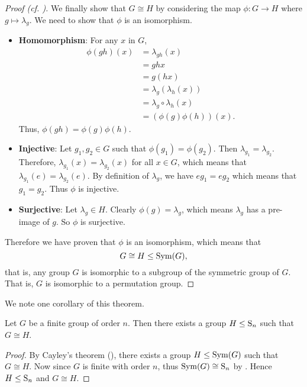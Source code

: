 \begin{proof}[Proof (cf. {\cite[Proof 2]{proofwiki_cayleys-theorem}})]
    We finally show that $G \cong H$ by considering the map $\phi: G\to H$ where $g \mapsto \lambda_g$. We need to show that $\phi$ is an isomorphism.
    \begin{itemize}
        \item \textbf{Homomorphism}: For any $x$ in $G$,
            \begin{align*}
                \phi(gh)(x) &= \lambda_{gh}(x)\\
                &= ghx\\
                &= g(hx)\\
                &= \lambda_g\left(\lambda_h(x)\right)\\
                &= \lambda_g\circ\lambda_h(x)\\
                &= (\phi(g)\phi(h))(x).
            \end{align*}
            Thus, $\phi(gh) = \phi(g)\phi(h)$.

        \item \textbf{Injective}: Let $g_1, g_2 \in G$ such that $\phi(g_1) = \phi(g_2)$. Then $\lambda_{g_1} = \lambda_{g_2}$. Therefore, $\lambda_{g_1}(x) = \lambda_{g_2}(x)$ for all $x \in G$, which means that $\lambda_{g_1}(e) = \lambda_{g_2}(e)$. By definition of $\lambda_g$, we have $eg_1 = eg_2$ which means that $g_1=g_2$. Thus $\phi$ is injective.

        \item \textbf{Surjective}: Let $\lambda_g \in H$. Clearly $\phi(g) = \lambda_g$, which means $\lambda_g$ has a pre-image of $g$. So $\phi$ is surjective.
    \end{itemize}
    Therefore we have proven that $\phi$ is an isomorphism, which means that
    \[
        G \cong H \leq \mathrm{Sym}(G),
    \]
    that is, any group $G$ is isomorphic to a subgroup of the symmetric group of $G$. That is, $G$ is isomorphic to a permutation group.
\end{proof}

We note one corollary of this theorem.
\begin{corollary}
    Let $G$ be a finite group of order $n$. Then there exists a group $H \leq \mathrm{S}_{n}$ such that $G \cong H$.
\end{corollary}
\begin{proof}
    By Cayley's theorem (), there exists a group $H \leq \mathrm{Sym}(G)$ such that $G \cong H$. Now since $G$ is finite with order $n$, thus $\mathrm{Sym}(G) \cong \mathrm{S}_{n}$ by . Hence $H \leq \mathrm{S}_{n}$ and $G \cong H$.
\end{proof}


